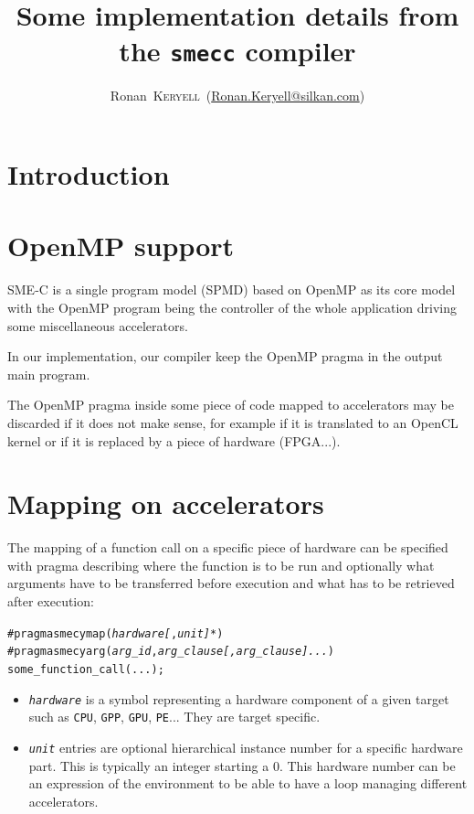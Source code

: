 \documentclass[a4paper]{article}
\begin{document}
\title{Some implementation details from the \texttt{smecc} compiler}

\author{Ronan~\textsc{Keryell}~(\url{Ronan.Keryell@silkan.com})}

\maketitle

\tableofcontents{}


\section{Introduction}
\label{sec:introduction}


\section{OpenMP support}
\label{sec:openmp-support}

SME-C is a single program model (SPMD) based on OpenMP as its core model
with the OpenMP program being the controller of the whole application
driving some miscellaneous accelerators.

In our implementation, our compiler keep the OpenMP pragma in the output
main program.

The OpenMP pragma inside some piece of code mapped to accelerators may be
discarded if it does not make sense, for example if it is translated to an
OpenCL kernel or if it is replaced by a piece of hardware (FPGA...).


\section{Mapping on accelerators}
\label{sec:mapping-hardware}

The mapping of a function call on a specific piece of hardware can be
specified with pragma describing where the function is to be run and
optionally what arguments have to be transferred before execution and what
has to be retrieved after execution:
\begin{alltt}
#pragma smecy map(\emph{hardware[}, \emph{unit]*})
#pragma smecy arg(\emph{arg_id}, \emph{arg_clause[, arg_clause]...})
  some_function_call(...);
\end{alltt}

\begin{itemize}
\item \texttt{\emph{hardware}} is a symbol representing a hardware
  component of a given target such as \texttt{CPU}, \texttt{GPP},
  \texttt{GPU}, \texttt{PE}... They are target specific.
\item \texttt{\emph{unit}} entries are optional hierarchical instance
  number for a specific hardware part. This is typically an integer
  starting a 0. This hardware number can be an expression of the
  environment to be able to have a loop managing different accelerators.
\end{itemize}
\end{document}
